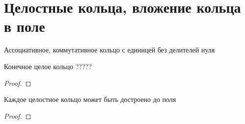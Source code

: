 \documentclass[../main/document.tex]{subfiles}
\begin{document}
\section{Целостные кольца, вложение кольца в поле}
\begin{dfn}
Ассоциативное, коммутативное кольцо с единицей без делителей нуля
\end{dfn}
\begin{thm}
Конечное целое кольцо ?????
\begin{proof}

\end{proof}
\end{thm}
\begin{thm}
Каждое целостное кольцо может быть достроено до поля
\begin{proof}

\end{proof}
\end{thm}
\end{document}
